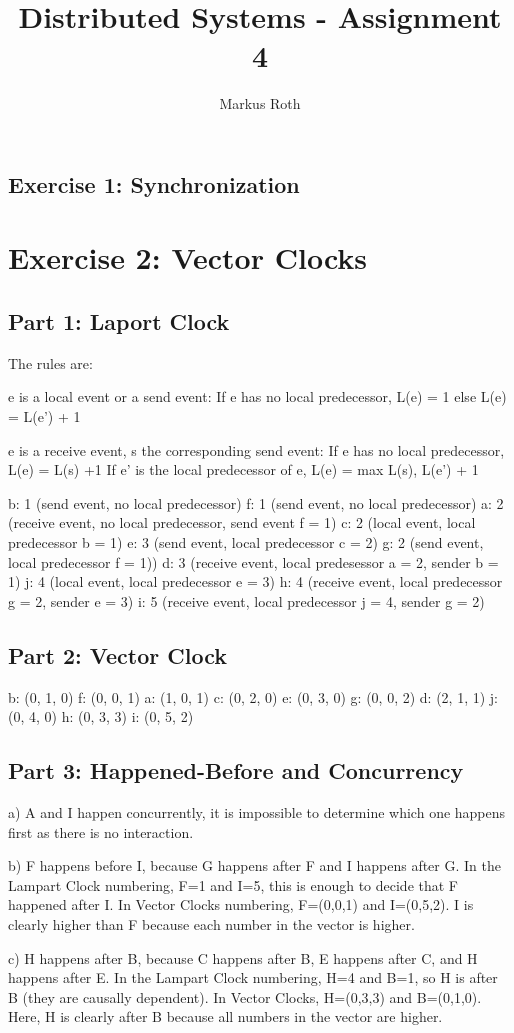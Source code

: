 \documentclass[a4paper]{article}
\title{Distributed Systems - Assignment 4}
\author{Markus Roth}
\begin{document}
\maketitle

\subsection{Exercise 1: Synchronization}



\section{Exercise 2: Vector Clocks}

\subsection{Part 1: Laport Clock}

The rules are:

e is a local event or a send event:
If e has no local predecessor, L(e) = 1 else L(e) = L(e’) + 1

e is a receive event, s the corresponding send event:
If e has no local predecessor, L(e) = L(s) +1
If e’ is the local predecessor of e, L(e) = max { L(s), L(e’) } + 1 

b: 1 (send event, no local predecessor)
f: 1 (send event, no local predecessor)
a: 2 (receive event, no local predecessor, send event f = 1)
c: 2 (local event, local predecessor b = 1)
e: 3 (send event, local predecessor c = 2)
g: 2 (send event, local predecessor f = 1))
d: 3 (receive event, local predesessor a = 2, sender b = 1)
j: 4 (local event, local predecessor e = 3)
h: 4 (receive event, local predecessor g = 2, sender e = 3)
i: 5 (receive event, local predecessor j = 4, sender g = 2)

\subsection{Part 2: Vector Clock}

b: (0, 1, 0)
f: (0, 0, 1)
a: (1, 0, 1)
c: (0, 2, 0)
e: (0, 3, 0)
g: (0, 0, 2)
d: (2, 1, 1)
j: (0, 4, 0)
h: (0, 3, 3)
i: (0, 5, 2)

\subsection{Part 3: Happened-Before and Concurrency}

a) A and I happen concurrently, it is impossible to determine which one happens first as there is no interaction.

b) F happens before I, because G happens after F and I happens after G. In the Lampart Clock numbering, F=1 and I=5, this is enough to decide that F happened after I. In Vector Clocks numbering, F=(0,0,1) and I=(0,5,2). I is clearly higher than F because each number in the vector is higher.

c) H happens after B, because C happens after B, E happens after C, and H happens after E. In the Lampart Clock numbering, H=4 and B=1, so H is after B (they are causally dependent). In Vector Clocks, H=(0,3,3) and B=(0,1,0). Here, H is clearly after B because all numbers in the vector are higher.
\end{document}
